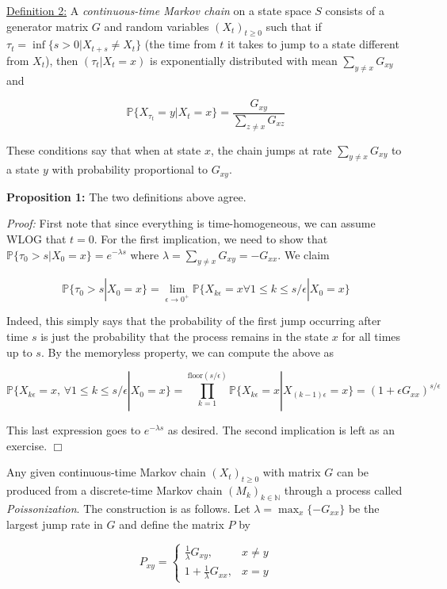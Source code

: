 \documentclass[10pt]{article}
\newcommand{\N}{\mathbb{N}}
\newcommand{\Prob}{\mathbb{P}}
\begin{document}
\noindent \underline{Definition 2:} A \textit{continuous-time Markov chain} on a state space $S$ consists of a generator matrix $G$ and random variables $(X_t)_{t \geq 0}$ such that if $\tau_t=\inf \{s>0 | X_{t+s} \neq X_t\}$ (the time from $t$ it takes to jump to a state different from $X_t$), then $(\tau_t | X_t=x)$ is exponentially distributed with mean $\sum_{y \neq x} G_{xy}$ and

\begin{equation} \label{eq:def2}
\Prob\{X_{\tau_t}=y | X_t=x \}=\frac{G_{xy}}{\sum_{z \neq x} G_{xz}}
\end{equation}

These conditions say that when at state $x$, the chain jumps at rate $\sum_{y \neq x} G_{xy}$ to a state $y$ with probability proportional to $G_{xy}$.

\noindent \textbf{Proposition 1:} The two definitions above agree.

\textit{Proof:} First note that since everything is time-homogeneous, we can assume WLOG that $t=0$. For the first implication, we need to show that $\Prob\{\tau_0>s | X_0=x\}=e^{-\lambda s}$ where $\lambda=\sum_{y \neq x} G_{xy}=-G_{xx}$. We claim

$$\Prob \{\tau_0>s | X_0=x\}=\lim_{\epsilon \rightarrow 0^+} \Prob\{ X_{k \epsilon}=x  \forall 1 \leq k \leq s/\epsilon | X_0=x\}$$

Indeed, this simply says that the probability of the first jump occurring after time $s$ is just the probability that the process remains in the state $x$ for all times up to $s$. By the memoryless property, we can compute the above as

$$\Prob\{ X_{k \epsilon}=x \text{,  } \forall 1 \leq k \leq s/\epsilon | X_0=x\}=\prod_{k=1}^{\text{floor}(s/\epsilon)} \Prob \{X_{k \epsilon}=x | X_{(k-1)\epsilon}=x\}=\left(1+\epsilon G_{xx} \right)^{s/\epsilon}$$

This last expression goes to $e^{-\lambda s}$ as desired. The second implication is left as an exercise.
\hfill
$\Box$

Any given continuous-time Markov chain $(X_t)_{t \geq 0}$ with matrix $G$ can be produced from a discrete-time Markov chain $(M_k)_{k \in \N}$ through a process called \textit{Poissonization}. The construction is as follows. Let $\lambda=\max_x \{-G_{xx}\}$ be the largest jump rate in $G$ and define the matrix $P$ by

$$P_{xy}=\left\{ \begin{matrix}
\tfrac{1}{\lambda} G_{xy}, & x \neq y \\
1+ \tfrac{1}{\lambda} G_{xx}, & x=y
\end{matrix} \right.$$
\end{document}

